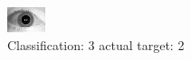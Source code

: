 \begin{figure}[h!]
\begin{center}
\includegraphics[width=0.60\columnwidth]{figures/ID1724_class_3_target_2.png}
\end{center}
\caption{ Classification: 3 actual target: 2}
\label{fig:ID1724_class_3_target_2}
\end{figure}
